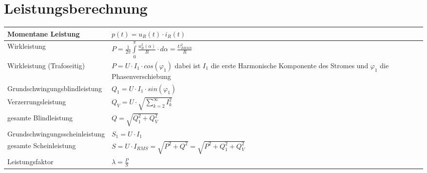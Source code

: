 \section{Leistungsberechnung}
\begin{tabu}{|p{0.3\textwidth}|p{0.6\textwidth}|}
  \hline
  Momentane Leistung
  	& $p(t) = u_{R}(t) \cdot i_{R}(t)$\\
  \hline
  Wirkleistung
  	& $P = \frac{1}{2\pi}\int\limits_{0}^{\pi}\frac{u_{R}^2(\alpha)}{R} \cdot d\alpha = \frac{U_{R RMS}^2}{R}$\\
  \hline
  Wirkleistung (Trafoseitig)
  	& $P = U \cdot I_{1} \cdot cos(\varphi_{1})$ \newline
  		dabei ist $I_{1}$ die erste Harmonische Komponente des Stromes \newline
  		und $\varphi_{1}$ die Phasenverschiebung\\
  \hline
  Grundschwingungsblindleistung
  	& $Q_{1} = U \cdot I_{1} \cdot sin(\varphi_{1})$\\
  \hline
  Verzerrungsleistung
  	& $Q_{V} =  U \cdot \sqrt{\sum\limits_{k = 2}^{\infty}I_{k}^2}$\\
  \hline
  gesamte Blindleistung
  	& $Q = \sqrt{Q_{1}^2 + Q_{V}^2}$\\
  \hline
  Grundschwingungsscheinleistung
  	& $S_{1} = U \cdot I_{1}$\\
  \hline
  gesamte Scheinleistung
  	& $S = U \cdot I_{RMS} = \sqrt{P^2 + Q^2} = \sqrt{P^2 + Q_{1}^2 + Q_{V}^2}$\\
  \hline
  Leistungsfaktor
  	& $\lambda = \frac{P}{S}$\\
  \hline
\end{tabu}